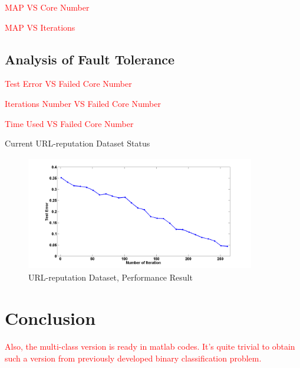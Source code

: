 \documentclass{llncs}
\newcommand{\comment}{\textcolor{red}}
\begin{document}
\comment{MAP VS Core Number}

\comment{MAP VS Iterations}

\subsection{Analysis of Fault Tolerance}

\comment{Test Error VS Failed Core Number}

\comment{Iterations Number VS Failed Core Number}

\comment{Time Used VS Failed Core Number}

Current URL-reputation Dataset Status

\begin{figure}[tb] \label{fig:01}
\center \includegraphics[height=5cm,width=10cm]{show1.png}
\caption{URL-reputation Dataset, Performance Result}
\end{figure}



\section{Conclusion} \label{sec:concl}

\comment{Also, the multi-class version is ready in matlab codes. It's quite trivial to obtain such a version from previously developed binary classification problem.}

\begin{small}


\end{small}
\end{document}
